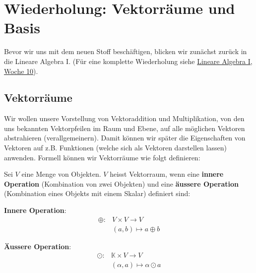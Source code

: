 \setcounter{section}{-1}
\section{Wiederholung: Vektorräume und Basis}

Bevor wir uns mit dem neuen Stoff beschäftigen, blicken wir zunächst zurück in die Lineare Algebra I. (Für eine komplette Wiederholung siehe \href{https://n.ethz.ch/~nbartzsch/notizen/notizen_lin_alg_I/Uebung_10_Repetition.pdf}{Lineare Algebra I, Woche 10}). 

\subsection{Vektorräume}

Wir wollen unsere Vorstellung von Vektoraddition und Multiplikation, von den uns bekannten Vektorpfeilen im Raum und Ebene, auf alle möglichen Vektoren abstrahieren (verallgemeinern). Damit können wir später die Eigenschaften von Vektoren auf z.B. Funktionen (welche sich als Vektoren darstellen lassen) anwenden. Formell können wir Vektorräume wie folgt definieren:

\begin{tcolorbox}[colback=gray!30, colframe=gray!80, title=Vektorräume]
Sei \( V \) eine Menge von Objekten. \( V \) heisst Vektorraum, wenn eine \textbf{innere Operation} (Kombination von zwei Objekten) und eine \textbf{äussere Operation} (Kombination eines Objekts mit einem Skalar) definiert sind:

\vspace{1\baselineskip}

\textbf{Innere Operation}: 
\begin{equation*}
    \begin{aligned}
        \oplus: &V \times V \rightarrow V \\
        &(a, b) \mapsto a \oplus b 
    \end{aligned}
\end{equation*}

\textbf{Äussere Operation}:
\begin{equation*}
    \begin{aligned}
        \odot: &\mathbb{K} \times V \rightarrow V \\
        &(\alpha, a) \mapsto \alpha \odot a 
    \end{aligned}
\end{equation*}

\end{tcolorbox}

